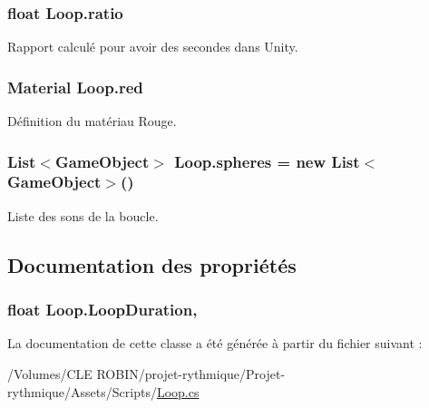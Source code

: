 \hypertarget{class_loop_a483ac8b940665a7661559d82b9f8b3e5}{}
\subsubsection[{ratio}]{\setlength{\rightskip}{0pt plus 5cm}float Loop.\+ratio\hspace{0.3cm}{\ttfamily [private]}}\label{class_loop_a483ac8b940665a7661559d82b9f8b3e5}


Rapport calculé pour avoir des secondes dans Unity. 

\hypertarget{class_loop_a081f72cca998dd79be5dfd7e27b126f4}{}
\subsubsection[{red}]{\setlength{\rightskip}{0pt plus 5cm}Material Loop.\+red\hspace{0.3cm}{\ttfamily [private]}}\label{class_loop_a081f72cca998dd79be5dfd7e27b126f4}


Définition du matériau Rouge. 

\hypertarget{class_loop_a49058954a754656c000691d0ea34d332}{}
\subsubsection[{spheres}]{\setlength{\rightskip}{0pt plus 5cm}List$<$Game\+Object$>$ Loop.\+spheres = new List$<$Game\+Object$>$()}\label{class_loop_a49058954a754656c000691d0ea34d332}


Liste des sons de la boucle. 



\subsection{Documentation des propriétés}
\hypertarget{class_loop_a50eeceb1774c7d9bb78f0b1c545010d2}{}
\subsubsection[{Loop\+Duration}]{\setlength{\rightskip}{0pt plus 5cm}float Loop.\+Loop\+Duration\hspace{0.3cm}{\ttfamily [get]}, {\ttfamily [set]}}\label{class_loop_a50eeceb1774c7d9bb78f0b1c545010d2}


La documentation de cette classe a été générée à partir du fichier suivant \+:\begin{DoxyCompactItemize}
\item 
/\+Volumes/\+C\+L\+E R\+O\+B\+I\+N/projet-\/rythmique/\+Projet-\/rythmique/\+Assets/\+Scripts/\hyperlink{_loop_8cs}{Loop.\+cs}\end{DoxyCompactItemize}
